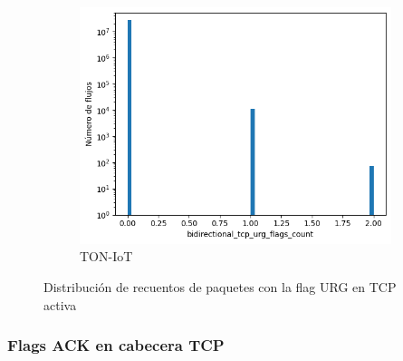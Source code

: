 \begin{figure}[H]
    \hfill
    \begin{subfigure}[b]{0.32\textwidth}
        \centering
        \includegraphics[width=\linewidth]{media/packet_pincer_toniot/bidirectional_tcp_urg_flags_count_linear_x_log_y.png}
        \caption{TON-IoT}
    \end{subfigure}
       \caption{Distribución de recuentos de paquetes con la flag URG en TCP activa}
       \label{fig:packet_pincer_bidirectional_tcp_urg_flags_count}
\end{figure}

\subsubsection{Flags ACK en cabecera TCP}

